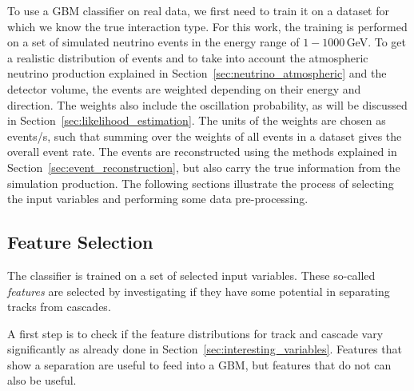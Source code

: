 To use a GBM classifier on real data, we first need to train it on a dataset for which we know the true interaction type.
For this work, the training is performed on a set of simulated neutrino events in the energy range of $1-1000$\,GeV.
To get a realistic distribution of events and to take into account the atmospheric neutrino production explained in Section~\ref{sec:neutrino_atmospheric} and the detector volume, the events are weighted depending on their energy and direction.
The weights also include the oscillation probability, as will be discussed in Section~\ref{sec:likelihood_estimation}.
The units of the weights are chosen as events/s, such that summing over the weights of all events in a dataset gives the overall event rate.
The events are reconstructed using the methods explained in Section~\ref{sec:event_reconstruction}, but also carry the true information from the simulation production.
The following sections illustrate the process of selecting the input variables and performing some data pre-processing.


\subsection{Feature Selection} \label{sec:feature_selection}

The classifier is trained on a set of selected input variables.
These so-called \textit{features} are selected by investigating if they have some potential in separating tracks from cascades.

A first step is to check if the feature distributions for track and cascade vary significantly as already done in Section~\ref{sec:interesting_variables}.
Features that show a separation are useful to feed into a GBM, but features that do not can also be useful.

